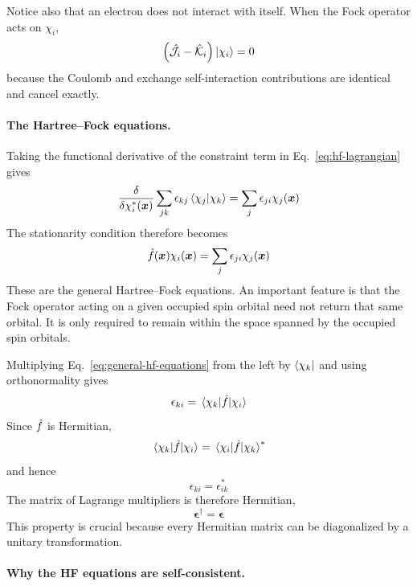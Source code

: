 \documentclass[11pt,a4paper,titlepage]{article}
\numberwithin{equation}{section}
\newcommand{\bx}{\boldsymbol{x}}
\newcommand{\beps}{\boldsymbol{\epsilon}}
\newcommand{\hf}{\Hat{f}}
\newcommand{\chJ}{\Hat{\mathcal{J}}}
\newcommand{\chK}{\Hat{\mathcal{K}}}
\begin{document}
Notice also that an electron does not interact with itself. When the Fock
operator acts on $\chi_i$,
\begin{equation}
  \qty(
    \chJ_i-\chK_i
  )
  \ket{\chi_i}
  =
  0
\end{equation}
because the Coulomb and exchange self-interaction contributions are
identical and cancel exactly.

\paragraph{The Hartree--Fock equations.}

Taking the functional derivative of the constraint term in
Eq.~\eqref{eq:hf-lagrangian} gives
\begin{equation}
  \fdv{}{\chi_i^*(\bx)}
  \sum_{jk}
  \epsilon_{kj}
  \braket{\chi_j}{\chi_k}
  =
  \sum_j
  \epsilon_{ji}
  \chi_j(\bx)
\end{equation}
The stationarity condition therefore becomes
\begin{equation}
  \hf(\bx)\chi_i(\bx)
  =
  \sum_j
  \epsilon_{ji}\chi_j(\bx)
  \label{eq:general-hf-equations}
\end{equation}
These are the general Hartree--Fock equations. An important feature is that
the Fock operator acting on a given occupied spin orbital need not return
that same orbital. It is only required to remain within the space spanned
by the occupied spin orbitals.

Multiplying Eq.~\eqref{eq:general-hf-equations} from the left by
$\bra{\chi_k}$ and using orthonormality gives
\begin{equation}
  \epsilon_{ki}
  =
  \mel{\chi_k}{\hf}{\chi_i}
  \label{eq:lagrange-fock}
\end{equation}
Since $\hf$ is Hermitian,
\begin{equation}
  \mel{\chi_k}{\hf}{\chi_i}
  =
  \mel{\chi_i}{\hf}{\chi_k}^*
\end{equation}
and hence
\begin{equation}
  \epsilon_{ki}
  =
  \epsilon_{ik}^*
\end{equation}
The matrix of Lagrange multipliers is therefore Hermitian,
\begin{equation}
  \beps^\dag=\beps
\end{equation}
This property is crucial because every Hermitian matrix can be diagonalized
by a unitary transformation.

\paragraph{Why the HF equations are self-consistent.}
\end{document}
